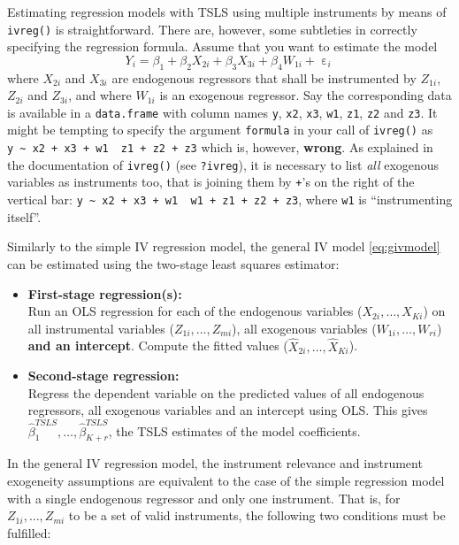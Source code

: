 \documentclass[
  14pt,
]{memoir}
\DeclareMathOperator{\eps}{\varepsilon}
\begin{document}
Estimating regression models with TSLS using multiple instruments by means of \texttt{ivreg()} is straightforward. There are, however, some subtleties in correctly specifying the regression formula. Assume that you want to estimate the model
\[
Y_i = \beta_1 + \beta_2 X_{2i} + \beta_3 X_{3i} + \beta_4 W_{1i} + \eps_i
\]
where \(X_{2i}\) and \(X_{3i}\) are endogenous regressors that shall be instrumented by \(Z_{1i}\), \(Z_{2i}\) and \(Z_{3i}\), and where \(W_{1i}\) is an exogenous regressor. Say the corresponding data is available in a \texttt{data.frame} with column names \texttt{y}, \texttt{x2}, \texttt{x3}, \texttt{w1}, \texttt{z1}, \texttt{z2} and \texttt{z3}. It might be tempting to specify the argument \texttt{formula} in your call of \texttt{ivreg()} as \texttt{y\ \textasciitilde{}\ x2\ +\ x3\ +\ w1\ \textbar{}\ z1\ +\ z2\ +\ z3} which is, however, \textbf{wrong}. As explained in the documentation of \texttt{ivreg()} (see \texttt{?ivreg}), it is necessary to list \emph{all} exogenous variables as instruments too, that is joining them by \texttt{+}'s on the right of the vertical bar: \texttt{y\ \textasciitilde{}\ x2\ +\ x3\ +\ w1\ \textbar{}\ w1\ +\ z1\ +\ z2\ +\ z3}, where \texttt{w1} is ``instrumenting itself''.

Similarly to the simple IV regression model, the general IV model \eqref{eq:givmodel} can be estimated using the two-stage least squares estimator:

\begin{itemize}
\item \textbf{First-stage regression(s):}\\
Run an OLS regression for each of the endogenous variables ($X_{2i},\dots,X_{Ki}$) on all instrumental variables ($Z_{1i},\dots,Z_{mi}$), all exogenous variables ($W_{1i},\dots,W_{ri}$) \textbf{and an intercept}. Compute the fitted values ($\widehat{X}_{2i},\dots,\widehat{X}_{Ki}$).
\item \textbf{Second-stage regression:}\\
Regress the dependent variable on the predicted values of all endogenous regressors, all exogenous variables and an intercept using OLS. This gives $\widehat{\beta}_{1}^{TSLS},\dots,\widehat{\beta}_{K+r}^{TSLS}$, the TSLS estimates of the model coefficients.
\end{itemize}

In the general IV regression model, the instrument relevance and instrument exogeneity assumptions are equivalent to the case of the simple regression model with a single endogenous regressor and only one instrument. That is, for \(Z_{1i},\dots,Z_{mi}\) to be a set of valid instruments, the following two conditions must be fulfilled:
\end{document}
